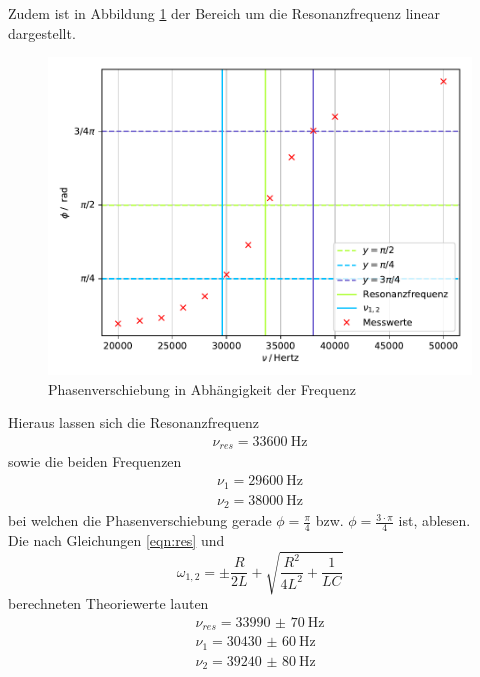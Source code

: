 Zudem ist in Abbildung \ref{fig:plot4} der Bereich um die Resonanzfrequenz linear
dargestellt.

\begin{figure}[H]
  \centering
  \includegraphics{plot5.pdf}
  \caption{Phasenverschiebung in Abhängigkeit der Frequenz}
  \label{fig:plot4}
\end{figure}

\noindent Hieraus lassen sich die Resonanzfrequenz
\begin{align*}
  \nu_{res}= \SI{33600}{\hertz}
\end{align*}
sowie die beiden Frequenzen
\begin{align*}
  \nu_1 = \SI{29600}{\hertz} \\
  \nu_2 = \SI{38000}{\hertz}
\end{align*}
bei welchen die Phasenverschiebung gerade $\phi = \frac{\pi}{4}$ bzw. $\phi= \frac{3 \cdot \pi}{4}$
ist, ablesen. \\
\noindent Die nach Gleichungen \ref{eqn:res} und
\begin{equation}
  \omega_{1,2} = \pm \frac{R}{2L} + \sqrt{\frac{R^2}{4L^2} + \frac{1}{LC}}
\end{equation}
berechneten Theoriewerte lauten
\begin{align*}
  \nu_{res}= \SI{33990(70)}{\hertz} \\
  \nu_1 = \SI{30430(60)}{\hertz} \\
  \nu_2 = \SI{39240(80)}{\hertz}
\end{align*}
